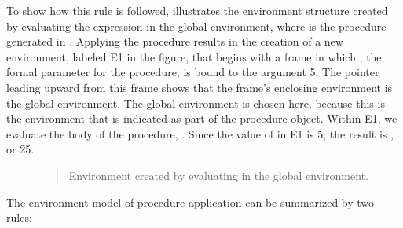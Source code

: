 To show how this rule is followed,  illustrates the environment
structure created by evaluating the expression  in the global
environment, where  is the procedure generated in .
Applying the procedure results in the creation of a new environment,
labeled E1 in the figure, that begins with a frame in which , the
formal parameter for the procedure, is bound to the argument 5.  The pointer
leading upward from this frame shows that the frame's enclosing environment is
the global environment.  The global environment is chosen here, because this is
the environment that is indicated as part of the  procedure
object.  Within E1, we evaluate the body of the procedure, .
Since the value of  in E1 is 5, the result is , or 25.

\begin{figure}[tb]
\label{Figure 3.3}
\centering
\begin{comment}
\heading{Figure 3.3:} Environment created by evaluating
\code{(square 5)} in the global environment.

\begin{example}
          +------------------------------------+
          | other variables                    |
global -->|                                    |
env       | square: --+                        |
          +-----------|---------------------+--+
                      |       ^             ^
(square 5)            |       |             |
                      V       |             |
                  .---.---.   |         +---+--+
                  | O | O-+---+   E1 -->| x: 5 |
                  `-|-^---'             +------+
                    |
                    V
                  parameters: x
                  body: (* x x)
\end{example}
\end{comment}

\begin{quote}
 Environment created by evaluating  in the global environment.
\end{quote}
\end{figure}

The environment model of procedure application can be summarized by two rules:

